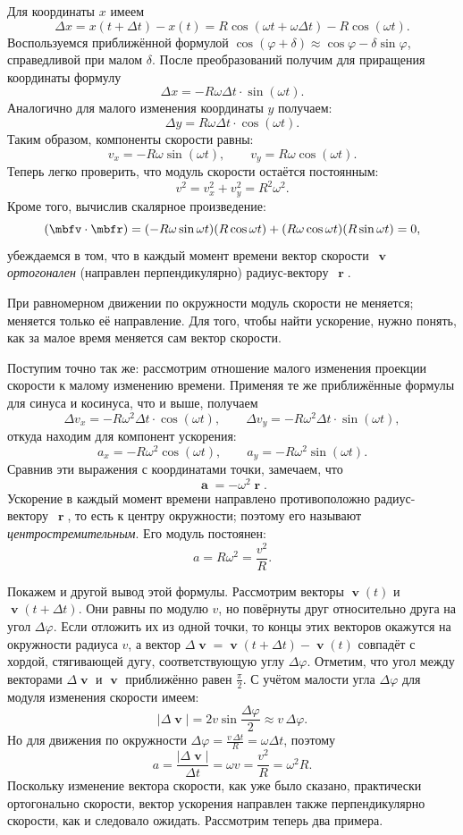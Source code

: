 \documentclass[../main.tex]{subfiles}
\begin{document}
Для координаты $x$ имеем
\[
\Delta x = x(t + \Delta t) - x(t)
= R\cos(\omega t + \omega\Delta t) - R\cos(\omega t).
\]
Воспользуемся приближённой формулой $\cos(\varphi + \delta) \approx \cos\varphi - \delta\sin\varphi$, справедливой при малом $\delta$. После преобразований получим для приращения координаты формулу
\[
\Delta x = -R\omega\Delta t \cdot \sin(\omega t).
\]
Аналогично для малого изменения координаты $y$ получаем:
\[
\Delta y = R\omega\Delta t \cdot\cos(\omega t).
\]
Таким образом, компоненты скорости равны:
\[
v_x = -R\omega\sin(\omega t), \qquad v_y =R\omega\cos(\omega t).
\]
Теперь легко проверить, что модуль скорости остаётся постоянным:
\[
v^2 = v_x^2 + v_y^2 = R^2\omega^2.
\]
Кроме того, вычислив скалярное произведение:
\[
\qty(\mbfv\cdot\mbfr) = (-R\omega\sin\omega t)(R\cos\omega t)
+ (R\omega\cos\omega t)(R\sin\omega t) = 0,
\]
убеждаемся в том, что в каждый момент времени вектор скорости~$\mbfv$  \textit{ортогонален} (направлен перпендикулярно) радиус-вектору~$\mbfr$.

При равномерном движении по окружности модуль скорости не меняется;
меняется только её направление. Для того, чтобы найти ускорение, нужно понять, как за малое время меняется сам вектор скорости.

Поступим точно так же: рассмотрим отношение малого изменения проекции скорости к малому изменению времени. Применяя те же приближённые формулы для синуса и косинуса, что и выше, получаем
\[
\Delta v_x = -R\omega^2\Delta t \cdot \cos(\omega t), \qquad
\Delta v_y = -R\omega^2\Delta t \cdot \sin(\omega t),
\]
откуда находим для компонент ускорения:
\[
a_x = -R\omega^2\cos(\omega t), \qquad a_y = -R\omega^2\sin(\omega t).
\]
Сравнив эти выражения с координатами точки, замечаем, что
\[
\mbfa = -\omega^2\mbfr.
\]
Ускорение в каждый момент времени направлено противоположно радиус-вектору~$\mbfr$, то есть к центру окружности; поэтому его называют \textit{центростремительным}. Его модуль постоянен:
\[
a = R\omega^2 = \frac{v^2}{R}.
\]

Покажем и другой вывод этой формулы. 
Рассмотрим  векторы $\mbfv(t)$ и $\mbfv(t + \Delta t)$. Они равны по модулю $v$, но повёрнуты друг относительно друга на угол
$\Delta\varphi$. Если отложить их из одной точки, то концы этих
векторов окажутся на окружности радиуса $v$, а вектор
$\Delta\mbfv = \mbfv(t + \Delta t) - \mbfv(t)$ совпадёт с хордой,
стягивающей дугу, соответствующую углу $\Delta\varphi$. Отметим, что угол между векторами $\Delta\mbfv$ и $\mbfv$ приближённо равен $\frac{\pi}{2}$. С учётом малости угла $\Delta\varphi$ для модуля изменения скорости имеем:
\[
|\Delta\mbfv| = 2v\sin\frac{\Delta\varphi}{2} \approx v \,\Delta\varphi.
\]
Но для движения по окружности $\Delta\varphi = \frac{v\,\Delta t}{R} = \omega\Delta t$, поэтому
\[
a = \frac{|\Delta\mbfv|}{\Delta t}
= \omega v = \frac{v^2}{R} = \omega^2 R.
\]
Поскольку изменение вектора скорости, как уже было сказано, практически ортогонально скорости, вектор ускорения направлен также перпендикулярно скорости, как и следовало ожидать.  Рассмотрим теперь два примера. 
\end{document}
